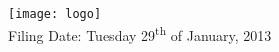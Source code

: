 \begin{titlepage}

\texttt{[image: logo]}\\[0.1cm]





\vfill
{\large Filing Date: Tuesday 29\textsuperscript{th} of January, 2013}





 


\end{titlepage}
